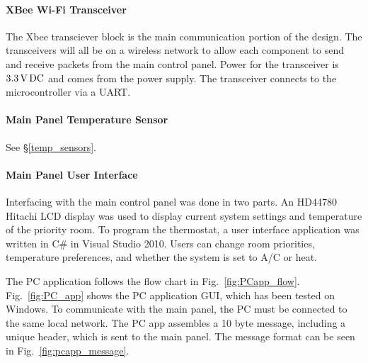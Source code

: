 \paragraph{XBee Wi-Fi Transceiver}
The Xbee transciever block is the main communication portion of the design. The transceivers will all be on a wireless network to allow each component to send and receive packets from the main control panel. Power for the transceiver is $3.3\mbox{\,V\,DC}$ and comes from the power supply. The transceiver connects to the microcontroller via a UART.

\paragraph{Main Panel Temperature Sensor}
See \S\ref{temp_sensors}. %

\paragraph{Main Panel User Interface}
\label{user_interface}
Interfacing with the main control panel was done in two parts. An HD44780 Hitachi LCD display was used to display current system settings and temperature of the priority room. To program the thermostat, a user interface application was written in C\# in Visual Studio 2010. Users can change room priorities, temperature preferences, and whether the system is set to A/C  or heat. 

The PC application follows the flow chart in Fig.~\ref{fig:PCapp_flow}. Fig.~\ref{fig:PC_app} shows the PC application GUI, which has been tested on Windows.  To communicate with the main panel, the PC must be connected to the same local network.  The PC app assembles a 10 byte message, including a unique header, which is sent to the main panel.  The message format can be seen in Fig.~\ref{fig:pcapp_message}.

